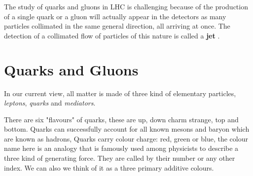 The study of quarks and gluons in LHC is challenging because of the production of a single quark or a gluon will actually appear in the detectors as many particles collimated in the same general direction, all arriving at once. The detection of a collimated flow of particles of this nature is called a \textbf{jet} \citep{Ellis:2007ib}.   



\section{Quarks and Gluons}
In our current view, all matter is made of three kind of elementary particles, \emph{leptons}, \emph{quarks} and \emph{mediators}.

There are six "flavours" of quarks, these are up, down charm strange, top and bottom.
Quarks can successfully account for all known mesons and baryon which are known as hadrons,
%
%
Quarks carry colour charge: red, green or blue, the colour name here is an analogy  that is famously used among physicists to describe a three kind of generating force. They are called by their number or any other index. We can also we think of it as a three primary additive colours. 

